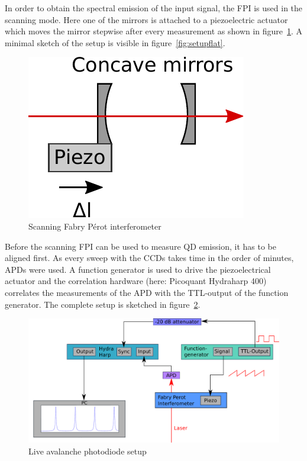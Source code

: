 In order to obtain the spectral emission of the input signal, the \ac{FPI} is used in the scanning mode.
Here one of the mirrors is attached to a piezoelectric actuator which moves the mirror stepwise after every measurement as shown in figure~\ref{fig:setup}. A minimal sketch of the setup is visible in figure~\ref{fig:setupflat}.
\begin{figure}[H]
	\centering
	\includegraphics[width=0.4\linewidth]{figures/fabry-perot/setup/setup}
	\caption{Scanning Fabry Pérot interferometer}
	\label{fig:setup}
\end{figure}
\newpage
{}
Before the scanning \ac{FPI} can be used to measure \ac{QD} emission, it has to be aligned first.
As every sweep with the \acp{CCD} takes time in the order of minutes, \acp{APD} were used.
A function generator is used to drive the piezoelectrical actuator and the correlation hardware (here: Picoquant Hydraharp 400) correlates the measurements of the \ac{APD} with the TTL-output of the function generator.
The complete setup is sketched in figure~\ref{fig:live-apd-setup}.


\begin{figure}[H]
	\centering
	\includegraphics[width=\linewidth]{figures/fabry-perot/live-apd-setup}
	\caption{Live avalanche photodiode setup}
	\label{fig:live-apd-setup}
\end{figure}


